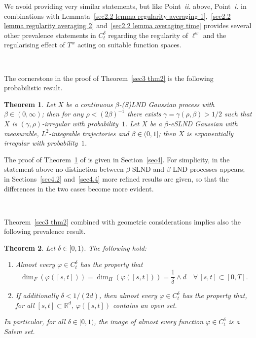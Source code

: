 \documentclass[10pt]{article}
\newcommand{\tmtextit}[1]{{\itshape{#1}}}
\newtheorem{theorem}{Theorem}%
\begin{document}
We avoid providing very similar statements, but like Point~\tmtextit{ii.}
above, Point~\tmtextit{i.} in combinations with Lemmata~\ref{sec2.2 lemma
regularity averaging 1},~\ref{sec2.2 lemma regularity averaging 2}
and~\ref{sec2.2 lemma averaging time} provides several other prevalence
statements in $C^{\delta}_t$ regarding the regularity of $\ell^w$ and the
regularising effect of $T^w$ acting on suitable function spaces.

\

The cornerstone in the proof of Theorem~\ref{sec3 thm2} is the following
probabilistic result.

\begin{theorem}
  \label{sec3 thm1}Let $X$ be a continuous $\beta$\mbox{-}(S)LND Gaussian
  process with $\beta \in (0, \infty)$; then for any $\rho < (2 \beta)^{- 1}$
  there exists $\gamma = \gamma (\rho, \beta) > 1 / 2$ such that $X$ is
  $(\gamma, \rho)$-irregular with probability~$1$. Let $X$ be a
  $\beta$\mbox{-}eSLND Gaussian with measurable, $L^2$\mbox{-}integrable
  trajectories and $\beta \in (0, 1]$; then $X$ is exponentially irregular
  with probability~$1$.
\end{theorem}

The proof of Theorem~\ref{sec3 thm1} of is given in Section~\ref{sec4}. For
simplicity, in the statement above no distinction between $\beta$\mbox{-}SLND
and $\beta$\mbox{-}LND processes appears; in Sections~\ref{sec4.2}
and~\ref{sec4.4} more refined results are given, so that the differences in
the two cases become more evident.

\

Theorem~\ref{sec3 thm2} combined with geometric considerations implies also
the following prevalence result.

\begin{theorem}
  \label{sec3 thm4}Let $\delta \in [0, 1)$. The following hold:
  \begin{enumerate}[label=\roman*.]
    \item Almost every $\varphi \in C^{\delta}_t$ has the property that
    \[ \dim_F (\varphi ([s, t])) = \dim_H (\varphi ([s, t])) =
       \frac{1}{\delta} \wedge d \quad \forall \, [s, t] \subset [0, T] . \]
    \item If additionally $\delta < 1 / (2 d)$, then almost every $\varphi \in
    C^{\delta}_t$ has the property that, for all $[s, t] \subset
    \mathbb{R}^d$, $\varphi ([s, t])$ contains an open set.
  \end{enumerate}
  In particular, for all $\delta \in [0, 1)$, the image of almost every
  function $\varphi \in C^{\delta}_t$ is a Salem set.
\end{theorem}
\end{document}
